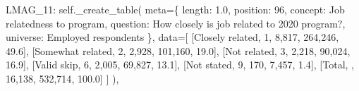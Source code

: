\documentclass[
  11pt,
  a4paper,
]{article}
\newenvironment{Shaded}{\begin{snugshade}}{\end{snugshade}}
\newcommand{\NormalTok}[1]{\textcolor[rgb]{0.00,0.23,0.31}{#1}}
\newcommand{\OperatorTok}[1]{\textcolor[rgb]{0.37,0.37,0.37}{#1}}
\newcommand{\StringTok}[1]{\textcolor[rgb]{0.13,0.47,0.30}{#1}}
\newcommand{\VariableTok}[1]{\textcolor[rgb]{0.07,0.07,0.07}{#1}}
\begin{document}
\begin{Shaded}
\begin{Highlighting}[]
    \StringTok{\textquotesingle{}LMAG\_11\textquotesingle{}}\NormalTok{: }\VariableTok{self}\NormalTok{.\_create\_table(}
\NormalTok{        meta}\OperatorTok{=}\NormalTok{\{}
            \StringTok{\textquotesingle{}length\textquotesingle{}}\NormalTok{: }\StringTok{\textquotesingle{}1.0\textquotesingle{}}\NormalTok{, }\StringTok{\textquotesingle{}position\textquotesingle{}}\NormalTok{: }\StringTok{\textquotesingle{}96\textquotesingle{}}\NormalTok{,}
            \StringTok{\textquotesingle{}concept\textquotesingle{}}\NormalTok{: }\StringTok{\textquotesingle{}Job relatedness to program\textquotesingle{}}\NormalTok{,}
            \StringTok{\textquotesingle{}question\textquotesingle{}}\NormalTok{: }\StringTok{\textquotesingle{}How closely is job related to 2020 program?\textquotesingle{}}\NormalTok{,}
            \StringTok{\textquotesingle{}universe\textquotesingle{}}\NormalTok{: }\StringTok{\textquotesingle{}Employed respondents\textquotesingle{}}
\NormalTok{        \},}
\NormalTok{        data}\OperatorTok{=}\NormalTok{[}
\NormalTok{            [}\StringTok{\textquotesingle{}Closely related\textquotesingle{}}\NormalTok{, }\StringTok{\textquotesingle{}1\textquotesingle{}}\NormalTok{, }\StringTok{\textquotesingle{}8,817\textquotesingle{}}\NormalTok{, }\StringTok{\textquotesingle{}264,246\textquotesingle{}}\NormalTok{, }\StringTok{\textquotesingle{}49.6\textquotesingle{}}\NormalTok{],}
\NormalTok{            [}\StringTok{\textquotesingle{}Somewhat related\textquotesingle{}}\NormalTok{, }\StringTok{\textquotesingle{}2\textquotesingle{}}\NormalTok{, }\StringTok{\textquotesingle{}2,928\textquotesingle{}}\NormalTok{, }\StringTok{\textquotesingle{}101,160\textquotesingle{}}\NormalTok{, }\StringTok{\textquotesingle{}19.0\textquotesingle{}}\NormalTok{],}
\NormalTok{            [}\StringTok{\textquotesingle{}Not related\textquotesingle{}}\NormalTok{, }\StringTok{\textquotesingle{}3\textquotesingle{}}\NormalTok{, }\StringTok{\textquotesingle{}2,218\textquotesingle{}}\NormalTok{, }\StringTok{\textquotesingle{}90,024\textquotesingle{}}\NormalTok{, }\StringTok{\textquotesingle{}16.9\textquotesingle{}}\NormalTok{],}
\NormalTok{            [}\StringTok{\textquotesingle{}Valid skip\textquotesingle{}}\NormalTok{, }\StringTok{\textquotesingle{}6\textquotesingle{}}\NormalTok{, }\StringTok{\textquotesingle{}2,005\textquotesingle{}}\NormalTok{, }\StringTok{\textquotesingle{}69,827\textquotesingle{}}\NormalTok{, }\StringTok{\textquotesingle{}13.1\textquotesingle{}}\NormalTok{],}
\NormalTok{            [}\StringTok{\textquotesingle{}Not stated\textquotesingle{}}\NormalTok{, }\StringTok{\textquotesingle{}9\textquotesingle{}}\NormalTok{, }\StringTok{\textquotesingle{}170\textquotesingle{}}\NormalTok{, }\StringTok{\textquotesingle{}7,457\textquotesingle{}}\NormalTok{, }\StringTok{\textquotesingle{}1.4\textquotesingle{}}\NormalTok{],}
\NormalTok{            [}\StringTok{\textquotesingle{}Total\textquotesingle{}}\NormalTok{, }\StringTok{\textquotesingle{}\textquotesingle{}}\NormalTok{, }\StringTok{\textquotesingle{}16,138\textquotesingle{}}\NormalTok{, }\StringTok{\textquotesingle{}532,714\textquotesingle{}}\NormalTok{, }\StringTok{\textquotesingle{}100.0\textquotesingle{}}\NormalTok{]}
\NormalTok{        ]}
\NormalTok{    ),}


\end{Highlighting}
\end{Shaded}
\end{document}
